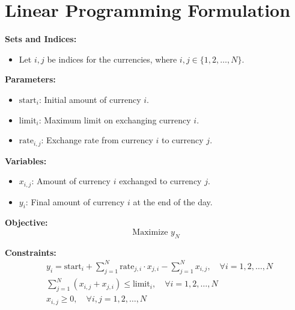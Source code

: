 \documentclass{article}
\begin{document}
\section*{Linear Programming Formulation}

\textbf{Sets and Indices:}
\begin{itemize}
    \item Let \( i, j \) be indices for the currencies, where \( i, j \in \{1, 2, \ldots, N\} \).
\end{itemize}

\textbf{Parameters:}
\begin{itemize}
    \item \( \text{start}_i \): Initial amount of currency \( i \).
    \item \( \text{limit}_i \): Maximum limit on exchanging currency \( i \).
    \item \( \text{rate}_{i,j} \): Exchange rate from currency \( i \) to currency \( j \).
\end{itemize}

\textbf{Variables:}
\begin{itemize}
    \item \( x_{i,j} \): Amount of currency \( i \) exchanged to currency \( j \).
    \item \( y_i \): Final amount of currency \( i \) at the end of the day.
\end{itemize}

\textbf{Objective:}
\[
\text{Maximize } y_N
\]

\textbf{Constraints:}
\begin{align}
    & y_i = \text{start}_i + \sum_{j=1}^{N} \text{rate}_{j,i} \cdot x_{j,i} - \sum_{j=1}^{N} x_{i,j}, \quad \forall i = 1, 2, \ldots, N \\
    & \sum_{j=1}^{N} (x_{i,j} + x_{j,i}) \leq \text{limit}_i, \quad \forall i = 1, 2, \ldots, N \\
    & x_{i,j} \geq 0, \quad \forall i, j = 1, 2, \ldots, N
\end{align}
\end{document}
